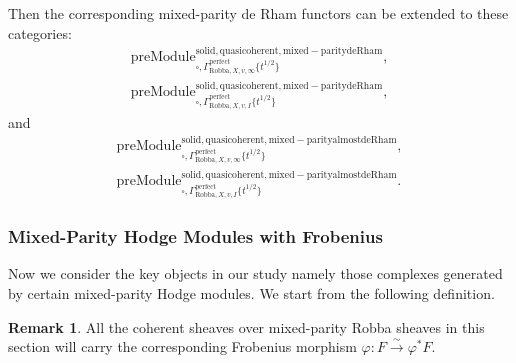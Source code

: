 \documentclass[12pt]{book}
\theoremstyle{definition}
\newtheorem{remark}{Remark}
\begin{document}
\indent Then the corresponding mixed-parity de Rham functors can be extended to these categories:
\begin{align}
\mathrm{preModule}^\mathrm{solid,quasicoherent,mixed-paritydeRham}_{\square,\Gamma^\mathrm{perfect}_{\text{Robba},X,v,\infty}\{t^{1/2}\}},\\
\mathrm{preModule}^\mathrm{solid,quasicoherent,mixed-paritydeRham}_{\square,\Gamma^\mathrm{perfect}_{\text{Robba},X,v,I}\{t^{1/2}\}}, 
\end{align}
and
\begin{align}
\mathrm{preModule}^\mathrm{solid,quasicoherent,mixed-parityalmostdeRham}_{\square,\Gamma^\mathrm{perfect}_{\text{Robba},X,v,\infty}\{t^{1/2}\}},\\
\mathrm{preModule}^\mathrm{solid,quasicoherent,mixed-parityalmostdeRham}_{\square,\Gamma^\mathrm{perfect}_{\text{Robba},X,v,I}\{t^{1/2}\}}. 
\end{align}



\subsubsection{Mixed-Parity Hodge Modules with Frobenius}


\noindent Now we consider the key objects in our study namely those complexes generated by certain mixed-parity Hodge modules. We start from the following definition.

\begin{remark}
All the coherent sheaves over mixed-parity Robba sheaves in this section will carry the corresponding Frobenius morphism $\varphi: F \overset{\sim}{\longrightarrow} \varphi^*F$.
\end{remark}
\end{document}
